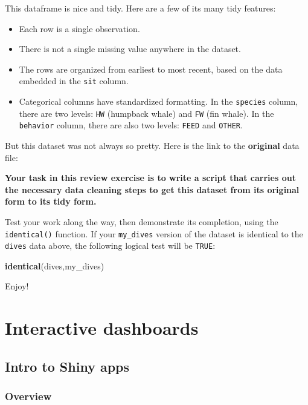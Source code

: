 \documentclass[
]{book}
\newenvironment{Shaded}{\begin{snugshade}}{\end{snugshade}}
\newcommand{\KeywordTok}[1]{\textcolor[rgb]{0.13,0.29,0.53}{\textbf{#1}}}
\newcommand{\NormalTok}[1]{#1}
\begin{document}
This dataframe is nice and tidy. Here are a few of its many tidy features:

\begin{itemize}
\item
  Each row is a single observation.
\item
  There is not a single missing value anywhere in the dataset.
\item
  The rows are organized from earliest to most recent, based on the data embedded in the \texttt{sit} column.
\item
  Categorical columns have standardized formatting. In the \texttt{species} column, there are two levels: \texttt{HW} (humpback whale) and \texttt{FW} (fin whale). In the \texttt{behavior} column, there are also two levels: \texttt{FEED} and \texttt{OTHER}.
\end{itemize}

But this dataset was not always so pretty. Here is the link to the \textbf{original} data file:

\textbf{Your task in this review exercise is to write a script that carries out the necessary data cleaning steps to get this dataset from its original form to its tidy form.}

Test your work along the way, then demonstrate its completion, using the \texttt{identical()} function. If your \texttt{my\_dives} version of the dataset is identical to the \texttt{dives} data above, the following logical test will be \texttt{TRUE}:

\begin{Shaded}
\begin{Highlighting}[]
\KeywordTok{identical}\NormalTok{(dives,my_dives)}
\end{Highlighting}
\end{Shaded}

Enjoy!

\hypertarget{part-interactive-dashboards}{%
\part{Interactive dashboards}\label{part-interactive-dashboards}}

\hypertarget{shiny}{%
\chapter{Intro to Shiny apps}\label{shiny}}

\hypertarget{overview}{%
\section*{Overview}\label{overview}}
\end{document}
